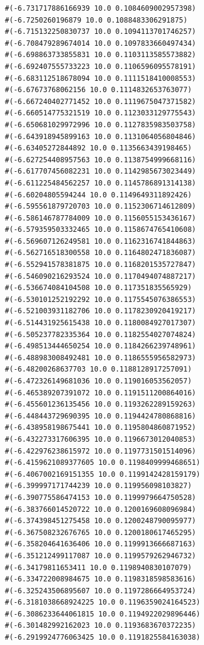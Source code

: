 \documentclass [11pt]{book}
\begin{document}
\begin{itemize}
\begin{figure}
\begin{lrbox}{\boxedverb}
\begin{minipage}{\linewidth}
{\begin{verbatim}
  #(-6.731717886166939 10.0 0.1084609002957398)
  #(-6.7250260196879 10.0 0.1088483306291875)
  #(-6.715132250830737 10.0 0.1094113701746257)
  #(-6.708479289674014 10.0 0.1097833660497434)
  #(-6.698863733855831 10.0 0.1103113585573882)
  #(-6.692407555733223 10.0 0.1106596095578191)
  #(-6.683112518678094 10.0 0.1111518410008553)
  #(-6.67673768062156 10.0 0.1114832653763077)
  #(-6.667240402771452 10.0 0.1119675047371582)
  #(-6.660514775321519 10.0 0.1123033129775543)
  #(-6.650681029972996 10.0 0.1127835983503758)
  #(-6.643918945899163 10.0 0.1131064056804846)
  #(-6.63405272844892 10.0 0.1135663439198465)
  #(-6.627254408957563 10.0 0.1138754999668116)
  #(-6.617707456082231 10.0 0.1142985673023449)
  #(-6.611225484562257 10.0 0.1145786891314138)
  #(-6.60204805594244 10.0 0.1149649311892426)
  #(-6.595561879720703 10.0 0.1152306714612809)
  #(-6.586146787784009 10.0 0.1156055153436167)
  #(-6.579359503332465 10.0 0.1158674765410608)
  #(-6.569607126249581 10.0 0.1162316741844863)
  #(-6.562716518300558 10.0 0.1164802471836087)
  #(-6.552941578381875 10.0 0.1168201535727847)
  #(-6.546090216293524 10.0 0.1170494074887217)
  #(-6.536674084104508 10.0 0.117351835565929)
  #(-6.530101252192292 10.0 0.1175545076386553)
  #(-6.521003931182706 10.0 0.1178230920419217)
  #(-6.514431925615438 10.0 0.1180084927017307)
  #(-6.505237782335364 10.0 0.1182554027074824)
  #(-6.498513444650254 10.0 0.1184266239748961)
  #(-6.488983008492481 10.0 0.1186555956582973)
  #(-6.48200268637703 10.0 0.1188128917257091)
  #(-6.472326149681036 10.0 0.119016053562057)
  #(-6.465389207391072 10.0 0.1191511200864016)
  #(-6.455601236135456 10.0 0.1193262289159263)
  #(-6.448443729690395 10.0 0.1194424780868816)
  #(-6.438958198675441 10.0 0.1195804860871952)
  #(-6.432273317606395 10.0 0.1196673012040853)
  #(-6.422976238615972 10.0 0.1197731501514096)
  #(-6.4159621089377605 10.0 0.1198409999468651)
  #(-6.4067002169151355 10.0 0.1199142428159179)
  #(-6.399997171744239 10.0 0.119956098103827)
  #(-6.390775586474153 10.0 0.1199979664750528)
  #(-6.383766014520722 10.0 0.1200169608096984)
  #(-6.374398451275458 10.0 0.1200248790095977)
  #(-6.367508232676765 10.0 0.1200180617465295)
  #(-6.358204641636406 10.0 0.1199913666687163)
  #(-6.351212499117087 10.0 0.1199579262946732)
  #(-6.34179811653411 10.0 0.1198940830107079)
  #(-6.334722008984675 10.0 0.1198318598583616)
  #(-6.325243506895607 10.0 0.1197286664953724)
  #(-6.3181038668924225 10.0 0.1196359024164523)
  #(-6.3086233644061815 10.0 0.1194922029896446)
  #(-6.301482992162023 10.0 0.1193683670372235)
  #(-6.2919924776063425 10.0 0.1191825584163038)

\end{verbatim}}
\end{minipage}
\end{lrbox}
\end{figure}
\end{itemize}
\end{document}
